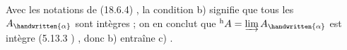  Avec les notations de (18.6.4) , la condition b) signifie
que tous les $A_{\handwritten{\alpha}}$ sont intègres ;  on en conclut que $ {}^{\mathrm h}A=\varinjlim A_{\handwritten{\alpha}}$ est intègre (5.13.3 ) , donc b) entraîne
c) .
